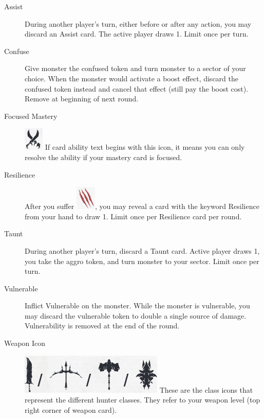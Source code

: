 \documentclass[12pt]{article}
\begin{document}
\pagebreak

\begin{mdframed}[style=SummaryCard, align=center, userdefinedwidth=35em, frametitle={Important Keywords (Ljonar)}]
    \begin{description}
        \item[Assist] During another player’s turn, either before or after any action, you may discard an Assist card. The active player draws 1. Limit once per turn.
        \item[Confuse] Give monster the confused token and turn monster to a sector of your choice. When the monster would activate a boost effect, discard the confused token instead and cancel that effect (still pay the boost cost). Remove at beginning of next round.
        \item[Focused Mastery] \includegraphics[scale=0.30]{images/mastery_icon.png} If card ability text begins with this icon, it means you can only resolve the ability if your mastery card is focused.
        \item[Resilience] After you suffer \includegraphics[scale=0.30]{images/monster_damage.png}, you may reveal a card with the keyword Resilience from your hand to draw 1. Limit once per Resilience card per round.
        \item[Taunt] During another player’s turn, discard a Taunt card. Active player draws 1, you take the aggro token, and turn monster to your sector. Limit once per turn.
        \item[Vulnerable] Inflict Vulnerable on the monster. While the monster is vulnerable, you may discard the vulnerable token to double a single source of damage. Vulnerability is removed at the end of the round.
        \item[Weapon Icon] \includegraphics[scale=0.20]{images/weapon_level.png} These are the class icons that represent the different hunter classes. They refer to your weapon level (top right corner of weapon card).
    \end{description}
\end{mdframed}
\end{document}
